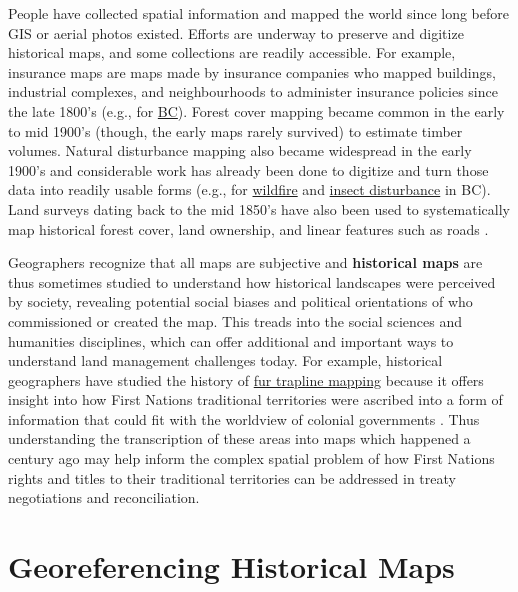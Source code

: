 \documentclass[
]{book}
\begin{document}
People have collected spatial information and mapped the world since long before GIS or aerial photos existed. Efforts are underway to preserve and digitize historical maps, and some collections are readily accessible. For example, insurance maps are maps made by insurance companies who mapped buildings, industrial complexes, and neighbourhoods to administer insurance policies since the late 1800's (e.g., for \href{https://guides.library.ubc.ca/c.php?g=699984\&p=4977440}{BC}). Forest cover mapping became common in the early to mid 1900's (though, the early maps rarely survived) to estimate timber volumes. Natural disturbance mapping also became widespread in the early 1900's and considerable work has already been done to digitize and turn those data into readily usable forms (e.g., for \href{https://catalogue.data.gov.bc.ca/dataset/fire-perimeters-historical}{wildfire} and \href{https://catalogue.data.gov.bc.ca/dataset/pest-infestation-polygons-historic}{insect disturbance} in BC). Land surveys dating back to the mid 1850's have also been used to systematically map historical forest cover, land ownership, and linear features such as roads \citep{tomscha_guide_2016}.

Geographers recognize that all maps are subjective and \textbf{historical maps} are thus sometimes studied to understand how historical landscapes were perceived by society, revealing potential social biases and political orientations of who commissioned or created the map. This treads into the social sciences and humanities disciplines, which can offer additional and important ways to understand land management challenges today. For example, historical geographers have studied the history of \href{https://catalogue.data.gov.bc.ca/dataset/traplines-of-british-columbia}{fur trapline mapping} because it offers insight into how First Nations traditional territories were ascribed into a form of information that could fit with the worldview of colonial governments \citep{iceton_many_2019}. Thus understanding the transcription of these areas into maps which happened a century ago may help inform the complex spatial problem of how First Nations rights and titles to their traditional territories can be addressed in treaty negotiations and reconciliation.

\hypertarget{georeferencing-historical-maps}{%
\section{Georeferencing Historical Maps}\label{georeferencing-historical-maps}}
\end{document}
